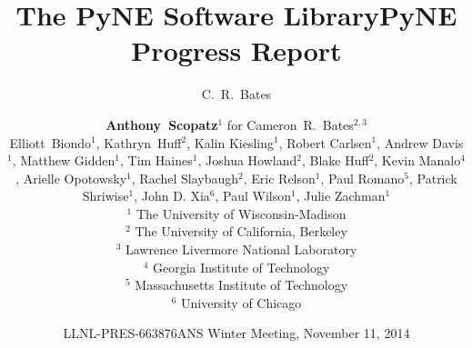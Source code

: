 \documentclass[xcolor=x11names,compress]{beamer}
\title{The PyNE Software Library}
\author{C.\ R.\ Bates}
\date{LLNL-PRES-663876}
\begin{document}
\begin{frame}
\title{PyNE Progress Report}
\author{\textbf{Anthony~Scopatz$^{1}$} for Cameron~R.~Bates$^{2,3}$ \\
        \vspace{0.1in}
        Elliott~Biondo$^{1}$, Kathryn~Huff$^{2}$,
        Kalin Kiesling$^{1}$,
        Robert Carlsen$^{1}$,
        Andrew Davis$^{1}$,
        Matthew Gidden$^{1}$,
        Tim Haines$^{1}$,
        Joshua Howland$^{2}$,
        Blake Huff$^{2}$,
        Kevin Manalo$^{4}$,
        Arielle Opotowsky$^{1}$,
        Rachel Slaybaugh$^{2}$,
        Eric Relson$^{1}$,
        Paul Romano$^{5}$,
        Patrick Shriwise$^{1}$,
        John D. Xia$^{6}$,
        Paul Wilson$^{1}$,
        Julie Zachman$^{1}$\\
        \vspace{0.1in}
        $^{1}$ The University of Wisconsin-Madison\\
        $^{2}$ The University of California, Berkeley\\
        $^{3}$ Lawrence Livermore National Laboratory\\
        $^{4}$ Georgia Institute of Technology\\
        $^{5}$ Massachusetts Institute of Technology\\
        $^{6}$ University of Chicago}

\date{ANS Winter Meeting, November 11, 2014}
\titlepage
\end{frame}
\end{document}
